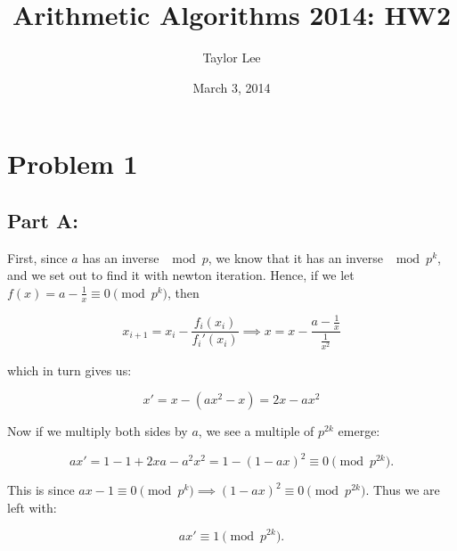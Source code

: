 \documentclass[12pt]{article}
\theoremstyle{moo}
\begin{document}
\fontseries {\seriesdefault}
\fontshape {\shapedefault}
\selectfont

\title{ Arithmetic Algorithms 2014: HW2}
\date{March 3, 2014}         %
\author{Taylor Lee}      %
\maketitle                      %





\section*{Problem 1}


\subsection*{Part A:}
First, since $a$ has an inverse $\mod{p}$, we know that it has an inverse $\mod{p^k}$, and we set out to find it with newton iteration. Hence, if we let $f(x) = a - \frac{1}{x} \equiv 0 \pmod{p^k}$, then 


\[
x_{i+1}=x_i - \frac{f_i(x_i)}{f_i'(x_i)}  \implies x = x - \frac{a-\frac{1}{x}}{\frac{1}{x^2}}
\]

which in turn gives us:


\[
x' = x - \left( ax^2 - x \right) = 2x - ax^2
\]

Now if we multiply both sides by $a$, we see a multiple of $p^{2k}$ emerge:

\[
ax' = 1 - 1 + 2xa - a^2x^2 = 1 - \left(1 - ax \right)^2 \equiv 0 \pmod{p^{2k}}. 
\]

This is since $ax - 1 \equiv 0 \pmod{p^k} \implies \left(1 - ax \right)^2 \equiv 0 \pmod{p^{2k}}$. Thus we are left with:

\[
ax' \equiv 1 \pmod{p^{2k}}.
\]
\end{document}

